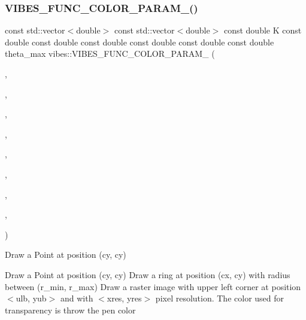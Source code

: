 \subsubsection{\texorpdfstring{V\+I\+B\+E\+S\+\_\+\+F\+U\+N\+C\+\_\+\+C\+O\+L\+O\+R\+\_\+\+P\+A\+R\+A\+M\+\_()}{VIBES\_FUNC\_COLOR\_PARAM\_4()}}
{\footnotesize\ttfamily const std\+::vector$<$double$>$ const std\+::vector$<$double$>$ const double K const double const double const double const double const double const double theta\+\_\+max vibes\+::\+V\+I\+B\+E\+S\+\_\+\+F\+U\+N\+C\+\_\+\+C\+O\+L\+O\+R\+\_\+\+P\+A\+R\+A\+M\+\_ (\begin{DoxyParamCaption}\item[{draw\+Ring}]{,  }\item[{const double \&}]{,  }\item[{cx}]{,  }\item[{const double \&}]{,  }\item[{cy}]{,  }\item[{const double \&}]{,  }\item[{r\+\_\+min}]{,  }\item[{const double \&}]{,  }\item[{r\+\_\+max}]{ }\end{DoxyParamCaption})}



Draw a Point at position (cy, cy) 

Draw a Point at position (cy, cy) Draw a ring at position (cx, cy) with radius between (r\+\_\+min, r\+\_\+max) Draw a raster image with upper left corner at position $<$ulb, yub$>$ and with $<$xres, yres$>$ pixel resolution. The color used for transparency is throw the pen color \mbox{\label{group__drawing_gaa1a216c77912e57296d3092253e0b2e4}} 
